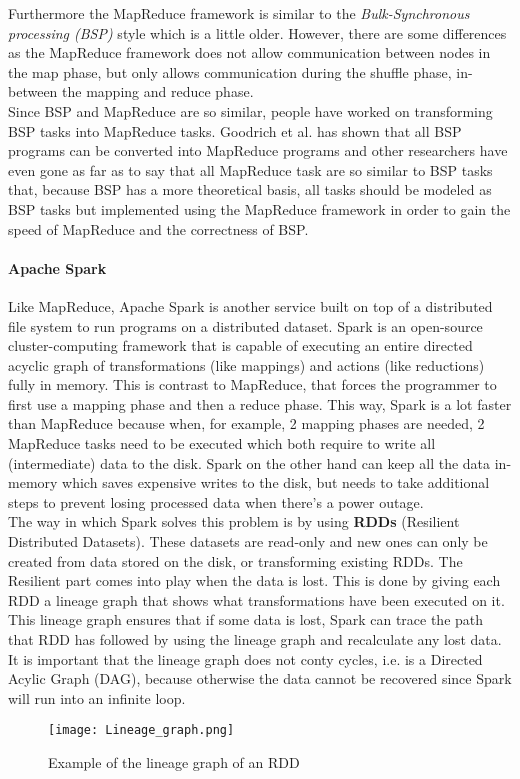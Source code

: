 Furthermore the MapReduce framework is similar to the \textit{Bulk-Synchronous processing (BSP)} style which is a little older. However, there are some differences as the MapReduce framework does not allow communication between nodes in the map phase, but only allows communication during the shuffle phase, in-between the mapping and reduce phase\cite{Pace12}.\\
Since BSP and MapReduce are so similar, people have worked on transforming BSP tasks into MapReduce tasks. Goodrich et al.\cite{Goo11} has shown that all BSP programs can be converted into MapReduce programs and other researchers have even gone as far as to say that all MapReduce task are so similar to BSP tasks that, because BSP has a more theoretical basis, all tasks should be modeled as BSP tasks but implemented using the MapReduce framework in order to gain the speed of MapReduce and the correctness of BSP\cite{Pace12}.

\paragraph{Apache Spark}
Like MapReduce, Apache Spark is another service built on top of a distributed file system to run programs on a distributed dataset. Spark is an open-source cluster-computing framework that is capable of executing an entire directed acyclic graph of transformations (like mappings) and actions (like reductions) fully in memory\cite{Sparkwebsite}. This is contrast to MapReduce, that forces the programmer to first use a mapping phase and then a reduce phase. This way, Spark is a lot faster than MapReduce because when, for example, 2 mapping phases are needed, 2 MapReduce tasks need to be executed which both require to write all (intermediate) data to the disk. Spark on the other hand can keep all the data in-memory which saves expensive writes to the disk, but needs to take additional steps to prevent losing processed data when there's a power outage.\\

The way in which Spark solves this problem is by using \textbf{RDDs} (Resilient Distributed Datasets). These datasets are read-only and new ones can only be created from data stored on the disk, or transforming existing RDDs\cite{Zaha12}. The Resilient part comes into play when the data is lost. This is done by giving each RDD a lineage graph that shows what transformations have been executed on it. This lineage graph ensures that if some data is lost, Spark can trace the path that RDD has followed by using the lineage graph and recalculate any lost data. It is important that the lineage graph does not conty cycles, i.e. is a Directed Acylic Graph (DAG), because otherwise the data cannot be recovered since Spark will run into an infinite loop.

\begin{figure}
	\begin{center}
		\texttt{[image: Lineage\_graph.png]}
	\end{center}
	\caption{Example of the lineage graph of an RDD\cite{Zaha12}}
	\label{lineagegraph}
\end{figure}
